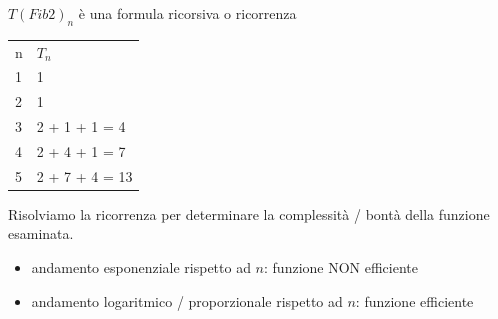 \documentclass{article}
\providecommand{\tightlist}{%
  \setlength{\itemsep}{0pt}\setlength{\parskip}{0pt}}
\begin{document}
{{{{$T(Fib2)_n$ è una formula ricorsiva o ricorrenza}

\begin{longtable}[]{@{}ll@{}}
\toprule
\begin{minipage}[t]{0.47\columnwidth}\raggedright\strut
{n}\strut
\end{minipage} & \begin{minipage}[t]{0.47\columnwidth}\raggedright\strut
$T_n$\strut
\end{minipage}\tabularnewline
\begin{minipage}[t]{0.47\columnwidth}\raggedright\strut
{1}\strut
\end{minipage} & \begin{minipage}[t]{0.47\columnwidth}\raggedright\strut
{1}\strut
\end{minipage}\tabularnewline
\begin{minipage}[t]{0.47\columnwidth}\raggedright\strut
{2}\strut
\end{minipage} & \begin{minipage}[t]{0.47\columnwidth}\raggedright\strut
{1}\strut
\end{minipage}\tabularnewline
\begin{minipage}[t]{0.47\columnwidth}\raggedright\strut
{3}\strut
\end{minipage} & \begin{minipage}[t]{0.47\columnwidth}\raggedright\strut
{2 + 1 + 1 = 4}\strut
\end{minipage}\tabularnewline
\begin{minipage}[t]{0.47\columnwidth}\raggedright\strut
{4}\strut
\end{minipage} & \begin{minipage}[t]{0.47\columnwidth}\raggedright\strut
{2 + 4 + 1 = 7}\strut
\end{minipage}\tabularnewline
\begin{minipage}[t]{0.47\columnwidth}\raggedright\strut
{5}\strut
\end{minipage} & \begin{minipage}[t]{0.47\columnwidth}\raggedright\strut
{2 + 7 + 4 = 13}\strut
\end{minipage}\tabularnewline
\bottomrule
\end{longtable}

{}

{Risolviamo la ricorrenza per determinare la complessità / bontà della
funzione esaminata.}

\begin{itemize}
\tightlist
\item
  {andamento esponenziale rispetto ad $n$: funzione NON efficiente}
\item
  {andamento logaritmico / proporzionale rispetto ad $n$: funzione
  efficiente}
\end{itemize}

}}}
\end{document}
